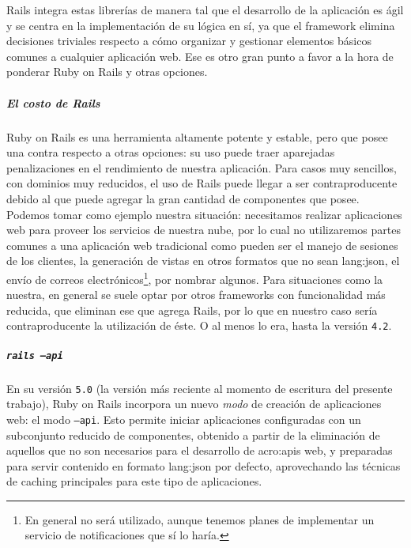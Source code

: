 Rails integra estas librerías de manera tal que el desarrollo de la aplicación es ágil y se centra en la implementación de su lógica en sí, ya que el framework elimina decisiones triviales respecto a cómo organizar y gestionar elementos básicos comunes a cualquier aplicación web. Ese es otro gran punto a favor a la hora de ponderar Ruby on Rails y otras opciones.

\subparagraph{El costo de Rails}

Ruby on Rails es una herramienta altamente potente y estable, pero que posee una contra respecto a otras opciones: su uso puede traer aparejadas penalizaciones en el rendimiento de nuestra aplicación. Para casos muy sencillos, con dominios muy reducidos, el uso de Rails puede llegar a ser contraproducente debido al  que puede agregar la gran cantidad de componentes que posee. Podemos tomar como ejemplo nuestra situación: necesitamos realizar aplicaciones web para proveer los servicios de nuestra nube, por lo cual no utilizaremos partes comunes a una aplicación web tradicional como pueden ser el manejo de sesiones de los clientes, la generación de vistas en otros formatos que no sean \gls{lang:json}, el envío de correos electrónicos\footnote{En general no será utilizado, aunque tenemos planes de implementar un servicio de notificaciones que sí lo haría.}, por nombrar algunos. Para situaciones como la nuestra, en general se suele optar por otros frameworks con funcionalidad más reducida, que eliminan ese  que agrega Rails, por lo que en nuestro caso sería contraproducente la utilización de éste. O al menos lo era, hasta la versión \texttt{4.2}.

\subparagraph{\texttt{rails --api}}

En su versión \texttt{5.0} (la versión más reciente al momento de escritura del presente trabajo), Ruby on Rails  incorpora un nuevo \textit{modo} de creación de aplicaciones web: el modo \texttt{--api}. Esto permite iniciar aplicaciones configuradas con un subconjunto reducido de componentes, obtenido a partir de la eliminación de aquellos que no son necesarios para el desarrollo de \glspl{acro:api} web, y preparadas para servir contenido en formato \gls{lang:json} por defecto, aprovechando las técnicas de caching principales para este tipo de aplicaciones.
